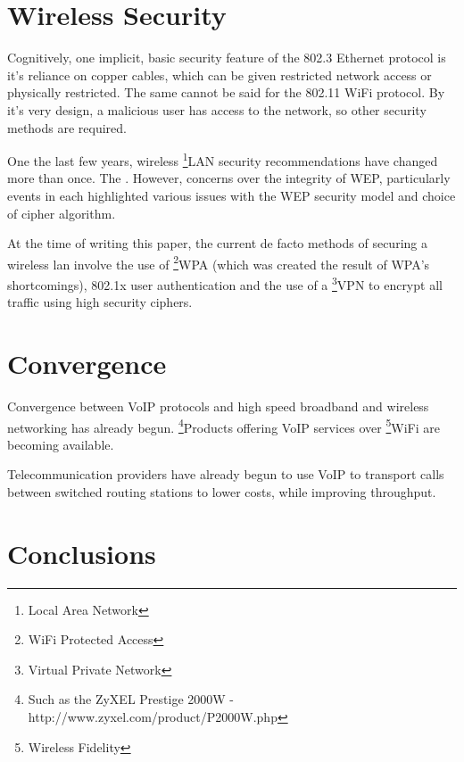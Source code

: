 \documentclass[a4paper,12pt]{article}
\begin{document}
\section{Wireless Security}

Cognitively, one implicit, basic security feature of the 802.3 Ethernet
protocol is it's
reliance on copper cables, which  can be given restricted network access
or physically restricted. The same cannot be said for the 802.11 WiFi
protocol. By it's very design, a malicious user has access to the
network, so other security methods are required.


One the last few years, wireless \footnote{Local Area Network}{LAN}
security recommendations have changed more than once. The 
\cite[802.11 standards define specifications for built in encryption,
entitled
\footnote{Wired Equivalent Privacy}{WEP}]{wikipedia-wep}. However,
concerns over the integrity of WEP, particularly events in \cite[2001,
including the University of California at Berkeley, a paper entitled
 by Fluhrer, 
Mantin, and Shamir and AT\&T]{wikipedia-80211} each highlighted various
issues with the WEP security model and choice of cipher algorithm.


At the time of writing this paper, the current de facto methods of
securing a wireless lan involve the use of \footnote{WiFi Protected
Access}{WPA} (which was created the result of WPA's shortcomings),
802.1x user authentication and the use of a \footnote{Virtual Private
Network}{VPN} to encrypt all traffic using high security ciphers.

\section{Convergence}

Convergence between VoIP protocols and high speed broadband and
wireless networking has already begun. 
\footnote{Such as the ZyXEL Prestige 2000W -
http://www.zyxel.com/product/P2000W.php}{Products}
offering VoIP services over \footnote{Wireless Fidelity}{WiFi}
are becoming available.


Telecommunication providers have already begun to use VoIP to transport
calls between switched routing stations to lower costs, while improving
throughput.

\section{Conclusions}
\end{document}
